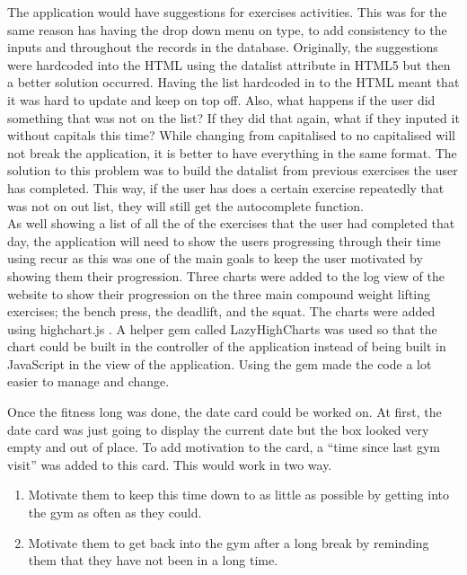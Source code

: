 The application would have suggestions for exercises activities. This was for the same reason has having the drop down menu on type, to add consistency to the inputs and throughout the records in the database. Originally, the suggestions were hardcoded into the HTML using the datalist attribute in HTML5 but then a better solution occurred. Having the list hardcoded in to the HTML meant that it was hard to update and keep on top off. Also, what happens if the user did something that was not on the list? If they did that again, what if they inputed it without capitals this time? While changing from capitalised to no capitalised will not break the application, it is better to have everything in the same format. The solution to this problem was to build the datalist from previous exercises the user has completed. This way, if the user has does a certain exercise repeatedly that was not on out list, they will still get the autocomplete function.\\

As well showing a list of all the of the exercises that the user had completed that day, the application will need to show the users progressing through their time using recur as this was one of the main goals to keep the user motivated by showing them their progression. Three charts were added to the log view of the website to show their progression on the three main compound weight lifting exercises; the bench press, the deadlift, and the squat. The charts were added using highchart.js \citep{highcharts:2009}. A helper gem called LazyHighCharts \citep{lhc:2010} was used so that the chart could be built in the controller of the application instead of being built in JavaScript in the view of the application. Using the gem made the code a lot easier to manage and change.

Once the fitness long was done, the date card could be worked on. At first, the date card was just going to display the current date but the box looked very empty and out of place. To add motivation to the card, a ``time since last gym visit'' was added to this card. This would work in two way.

\begin{enumerate}
\item Motivate them to keep this time down to as little as possible by getting into the gym as often as they could.
\item Motivate them to get back into the gym after a long break by reminding them that they have not been in a long time.
\end{enumerate}


